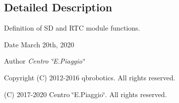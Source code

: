 \subsection{Detailed Description}
Definition of SD and R\+TC module functions. 

\begin{DoxyDate}{Date}
March 20th, 2020 
\end{DoxyDate}
\begin{DoxyAuthor}{Author}
{\itshape Centro \char`\"{}\+E.\+Piaggio\char`\"{}} 
\end{DoxyAuthor}
\begin{DoxyCopyright}{Copyright}
(C) 2012-\/2016 qbrobotics. All rights reserved. 

(C) 2017-\/2020 Centro \char`\"{}\+E.\+Piaggio\char`\"{}. All rights reserved. 
\end{DoxyCopyright}
